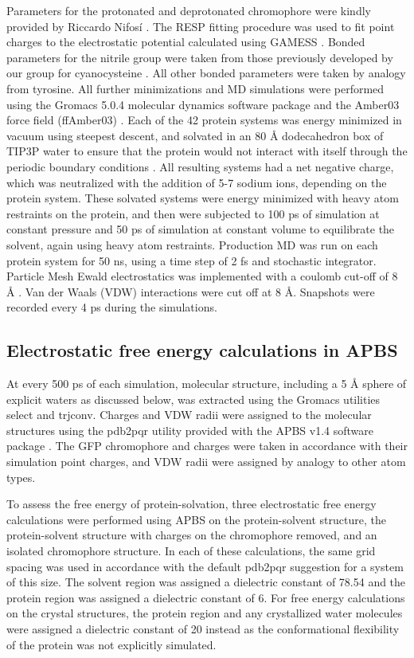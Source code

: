 Parameters for the protonated and deprotonated chromophore were kindly provided by Riccardo Nifos\'i \cite{Nifosi2003}.
The RESP fitting procedure was used to fit point charges to the electrostatic potential calculated using GAMESS \cite{Bayly1993}.
Bonded parameters for the nitrile group were taken from those previously developed by our group for cyanocysteine \cite{Ragain2012}.
All other bonded parameters were taken by analogy from tyrosine. 
All further minimizations and MD simulations were performed using the Gromacs 5.0.4 molecular dynamics software package \cite{VanDerSpoel2005, Abraham2015} and the Amber03 force field (ffAmber03) \cite{Duan2003, Sorin2005}.
Each of the 42 protein systems was energy minimized in vacuum using steepest descent, and solvated in an 80 \si{\angstrom} dodecahedron box of TIP3P water to ensure that the protein would not interact with itself through the periodic boundary conditions \cite{Jorgensen1983}.
All resulting systems had a net negative charge, which was neutralized with the addition of 5-7 sodium ions, depending on the protein system. 
These solvated systems were energy minimized with heavy atom restraints on the protein, and then were subjected to 100 ps of simulation at constant pressure and 50 ps of simulation at constant volume to equilibrate the solvent, again using heavy atom restraints. 
Production MD was run on each protein system for 50 \si{\ns}, using a time step of 2 fs and stochastic integrator. 
Particle Mesh Ewald electrostatics was implemented with a coulomb cut-off of 8 \si{\angstrom} \cite{Cheatham1995}.
Van der Waals (VDW) interactions were cut off at 8 \si{\angstrom}. 
Snapshots were recorded every 4 ps during the simulations.  

\subsection{Electrostatic free energy calculations in APBS}

At every 500 ps of each simulation, molecular structure, including a 5 \si{\angstrom} sphere of explicit waters as discussed below, was extracted using the Gromacs utilities select and trjconv. 
Charges and VDW radii were assigned to the molecular structures using the pdb2pqr utility provided with the APBS v1.4 software package \cite{Dolinsky2007}.
The GFP chromophore and \pCNF{} charges were taken in accordance with their simulation point charges, and VDW radii were assigned by analogy to other atom types.

To assess the free energy of protein-solvation, three electrostatic free energy calculations were performed using APBS on the protein-solvent structure, the protein-solvent structure with charges on the chromophore removed, and an isolated chromophore structure. 
In each of these calculations, the same grid spacing was used in accordance with the default pdb2pqr suggestion for a system of this size. 
The solvent region was assigned a dielectric constant of 78.54 and the protein region was assigned a dielectric constant of 6. 
For free energy calculations on the crystal structures, the protein region and any crystallized water molecules were assigned a dielectric constant of 20 instead as the conformational flexibility of the protein was not explicitly simulated.

